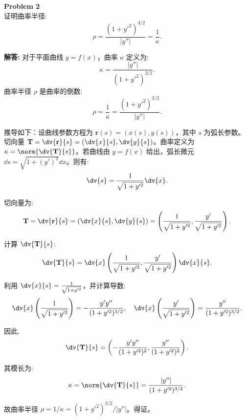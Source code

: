 \documentclass[12pt, a4paper, oneside]{ctexart}
\newenvironment{solution}{\par\noindent\textbf{解答:}\quad}{\par}
\begin{document}
\begin{mdframed}[backgroundcolor=gray!10, linewidth=0pt]
    \textbf{Problem 2} \\
    证明曲率半径:
    \[
    \rho = \frac{(1+y'^2)^{3/2}}{|y''|} = \frac{1}{\kappa}.
    \]
\end{mdframed}
\begin{solution}
    对于平面曲线 \(y = f(x)\)，曲率 \(\kappa\) 定义为:
    \[
    \kappa = \frac{|y''|}{(1 + y'^2)^{3/2}}.
    \]
    曲率半径 \(\rho\) 是曲率的倒数:
    \[
    \rho = \frac{1}{\kappa} = \frac{(1 + y'^2)^{3/2}}{|y''|}.
    \]
    
    推导如下：设曲线参数方程为 \(\mathbf{r}(s) = (x(s), y(s))\)，其中 \(s\) 为弧长参数。切向量 \(\mathbf{T} = \dv{\mathbf{r}}{s} = (\dv{x}{s}, \dv{y}{s})\)。曲率定义为 \(\kappa = \norm{\dv{\mathbf{T}}{s}}\)。若曲线由 \(y = f(x)\) 给出，弧长微元 \(\dd s = \sqrt{1 + (y')^2} \dd x\)。则有:
    \[
    \dv{s} = \frac{1}{\sqrt{1 + y'^2}} \dv{x}.
    \]
    
    切向量为:
    \[
    \mathbf{T} = \dv{\mathbf{r}}{s} = \left( \dv{x}{s}, \dv{y}{s} \right) = \left( \frac{1}{\sqrt{1 + y'^2}}, \frac{y'}{\sqrt{1 + y'^2}} \right).
    \]
    
    计算 \(\dv{\mathbf{T}}{s}\):
    \[
    \dv{\mathbf{T}}{s} = \dv{x} \left( \frac{1}{\sqrt{1 + y'^2}}, \frac{y'}{\sqrt{1 + y'^2}} \right) \dv{x}{s}.
    \]
    
    利用 \(\dv{x}{s} = \frac{1}{\sqrt{1 + y'^2}}\)，并计算导数:
    \[
    \dv{x} \left( \frac{1}{\sqrt{1 + y'^2}} \right) = -\frac{y' y''}{(1 + y'^2)^{3/2}}, \quad \dv{x} \left( \frac{y'}{\sqrt{1 + y'^2}} \right) = \frac{y''}{(1 + y'^2)^{3/2}}.
    \]
    
    因此,
    \[
    \dv{\mathbf{T}}{s} = \left( -\frac{y' y''}{(1 + y'^2)^2}, \frac{y''}{(1 + y'^2)^2} \right).
    \]
    
    其模长为:
    \[
    \kappa = \norm{\dv{\mathbf{T}}{s}} = \frac{|y''|}{(1 + y'^2)^{3/2}}.
    \]
    
    故曲率半径 \(\rho = 1/\kappa = (1 + y'^2)^{3/2} / |y''|\)。得证。
\end{solution}
\end{document}
